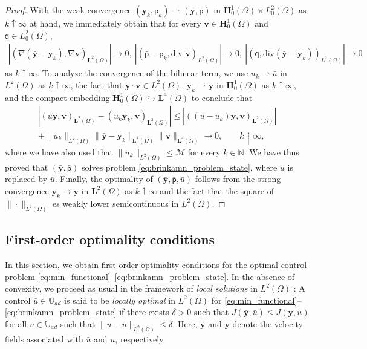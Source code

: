 \documentclass[final]{siamart0216}
\begin{document}
\begin{proof}
With the weak convergence $(\mathbf{y}_k,\mathsf{p}_k)\rightharpoonup (\bar{\mathbf{y}},\bar{\mathsf{p}})$ in $\mathbf{H}_0^1(\Omega)\times L_0^2(\Omega)$ as $k\uparrow\infty$ at hand, we immediately obtain that for every $\mathbf{v}\in\mathbf{H}_0^1(\Omega)$ and $\mathsf{q}\in L_0^2(\Omega)$,
\begin{align*}
|(\nabla (\bar{\mathbf{y}}-\mathbf{y}_k),\nabla \mathbf{v})_{\mathbf{L}^2(\Omega)}|\to 0,~ |(\bar{\mathsf{p}}-\mathsf{p}_k,\text{div }\mathbf{v})_{L^2(\Omega)}|\to 0,~ |(\mathsf{q},\text{div}(\bar{\mathbf{y}}-\mathbf{y}_k))_{L^2(\Omega)}|\to 0
\end{align*}
as $k\uparrow \infty$. To analyze the convergence of the bilinear term, we use $u_k \rightharpoonup\bar{u}$ in $L^2 (\Omega)$ as $k\uparrow\infty$, the fact that $\bar{\mathbf{y}}\cdot\mathbf{v}\in L^2(\Omega)$, $\mathbf{y}_k\rightharpoonup \bar{\mathbf{y}}$ in $\mathbf{H}_0^1(\Omega)$ as $k\uparrow\infty$, and the compact embedding $\mathbf{H}_0^1(\Omega) \hookrightarrow\mathbf{L}^4(\Omega)$ \cite[Theorem 6.3, Part I]{MR2424078} to conclude that
\begin{multline*}
|(\bar{u}\bar{\mathbf{y}},\mathbf{v})_{\mathbf{L}^2(\Omega)} - (u_k\mathbf{y}_k,\mathbf{v})_{\mathbf{L}^2(\Omega)}|
\leq 
|\left((\bar{u} - u_k)\bar{\mathbf{y}},\mathbf{v}\right)_{\mathbf{L}^2(\Omega)}|
\\
+ 
\| u_k \|_{L^2(\Omega)}
\| \bar{\mathbf{y}} - \mathbf{y}_k \|_{\mathbf{L}^4(\Omega)}
\| \mathbf{v} \|_{\mathbf{L}^4(\Omega)}
\to 0, 
\qquad k\uparrow\infty,
\end{multline*}
where we have also used that $\| u_k \|_{L^2(\Omega)} \leq \mathcal{M}$ for every $k \in \mathbb{N}$. We have thus proved that $(\bar{\mathbf{y}},\bar{\mathsf{p}})$ solves problem \eqref{eq:brinkamn_problem_state}, where $u$ is replaced by $\bar{u}$. Finally, the optimality of $(\bar{\mathbf{y}},\bar{\mathsf{p}},\bar{u})$ follows from the strong convergence $\mathbf{y}_k\to\bar{\mathbf{y}}$ in $\mathbf{L}^2(\Omega)$ as $k\uparrow\infty$ and the fact that the square of $\|\cdot\|_{L^2(\Omega)}$ es weakly lower semicontinuous in $L^2(\Omega)$.
\end{proof}

\subsection{First-order optimality conditions}\label{section:firstconditions}
In this section, we obtain first-order optimality conditions for the optimal control problem \eqref{eq:min_functional}--\eqref{eq:brinkamn_problem_state}.
In the absence of convexity, we proceed as usual in the framework of \emph{local solutions} in $L^2(\Omega)$ \cite[page 207]{MR2583281}: A control $\bar{u}\in\mathbb{U}_{ad}$ is said to be \emph{locally optimal} in $L^2(\Omega)$ for \eqref{eq:min_functional}--\eqref{eq:brinkamn_problem_state} if there exists $\delta>0$ such that $J(\bar{\mathbf{y}},\bar{u})\leq J(\mathbf{y},u)$ for all $u\in \mathbb{U}_{ad}$ such that $\|u-\bar{u}\|_{L^2(\Omega)}\leq \delta$. Here, $\bar{\mathbf{y}}$ and $\mathbf{y}$ denote the velocity fields associated with $\bar{u}$ and $u$, respectively.
\end{document}

